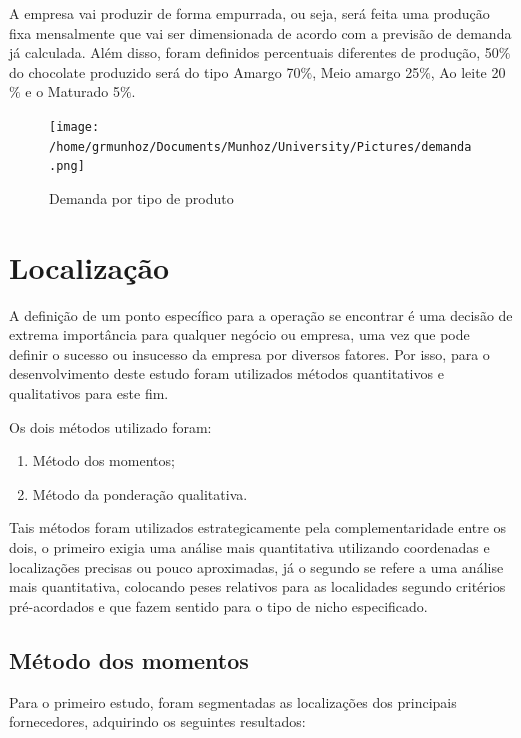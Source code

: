 \documentclass[
	12pt,				%
	openright,			%
	oneside,			%
	a4paper,			%
	english,			%
	french,				%
	spanish,			%
	brazil				%
	]{abntex2}
\begin{document}
A empresa vai produzir de forma empurrada, ou seja, será feita uma produção fixa mensalmente que vai ser dimensionada de acordo com a previsão de demanda já calculada. Além disso, foram definidos percentuais diferentes de produção, 50$\%$ do chocolate produzido será do tipo Amargo 70$\%$, Meio amargo 25$\%$, Ao leite 20$\%$ e o Maturado 5$\%$.

\begin{figure}[H]
\begin{center}
\caption{Demanda por tipo de produto}
\texttt{[image: /home/grmunhoz/Documents/Munhoz/University/Pictures/demanda.png]} 
\label{loca}
\end{center}
\end{figure}

\newpage
\chapter{Localização}

A definição de um ponto específico para a operação se encontrar é uma decisão de extrema importância para qualquer negócio ou empresa, uma vez que pode definir o sucesso ou insucesso da empresa por diversos fatores. Por isso, para o desenvolvimento deste estudo foram utilizados métodos quantitativos e qualitativos para este fim.

Os dois métodos utilizado foram:

\begin{enumerate}
\item Método dos momentos;
\item Método da ponderação qualitativa.
\end{enumerate}

Tais métodos foram utilizados estrategicamente pela complementaridade entre os dois, o primeiro exigia uma análise mais quantitativa utilizando coordenadas e localizações precisas ou pouco aproximadas, já o  segundo se refere a uma análise mais quantitativa, colocando peses relativos para as localidades segundo critérios pré-acordados e que fazem sentido para o tipo de nicho especificado.

\section{Método dos momentos}

Para o primeiro estudo, foram segmentadas as localizações dos principais fornecedores, adquirindo os seguintes resultados:
\end{document}
